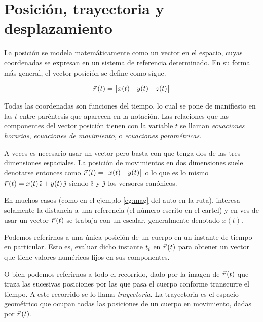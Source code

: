 \section{Posición, trayectoria y desplazamiento}

La posición se modela matemáticamente como un vector en el espacio, cuyas coordenadas se expresan en un sistema de referencia determinado.
En su forma más general, el vector posición se define como sigue.

\begin{mdframed}[style=DefinitionFrame]
    \begin{defn}
        \label{defn:position}
    \end{defn}
    \begin{equation*}
        \vec{r}\hspace{0.05cm}(t) = \begin{bmatrix} x(t) & y(t) & z(t) \end{bmatrix}
    \end{equation*}
\end{mdframed}

Todas las coordenadas son funciones del tiempo, lo cual se pone de manifiesto en las $t$ entre paréntesis que aparecen en la notación.
Las relaciones que las componentes del vector posición tienen con la variable $t$ se llaman \emph{ecuaciones horarias}, \emph{ecuaciones de movimiento}, o \emph{ecuaciones paramétricas}.

A veces es necesario usar un vector pero basta con que tenga dos de las tres dimensiones espaciales.
La posición de movimientos en dos dimensiones suele denotarse entonces como $\vec{r}\hspace{0.05cm}(t)={ \begin{bmatrix} x(t)&y(t) \end{bmatrix} }$ o lo que es lo mismo $\vec{r}\hspace{0.05cm}(t)=x(t)\,\hat{\imath} + y(t)\,\hat{\jmath}$ siendo $\hat{\imath}$ y $\hat{\jmath}$ los versores canónicos.

En muchos casos (como en el ejemplo \ref{eg:mag} del auto en la ruta), interesa solamente la distancia a una referencia (el número escrito en el cartel) y en ves de usar un vector $\vec{r}\hspace{0.05cm}(t)$ se trabaja con un escalar, generalmente denotado $x(t)$.

Podemos referirnos a una única posición de un cuerpo en un instante de tiempo en particular.
Esto es, evaluar dicho instante $t_i$ en $\vec{r}\hspace{0.05cm}(t)$ para obtener un vector que tiene valores numéricos fijos en sus componentes.

O bien podemos referirnos a todo el recorrido, dado por la imagen de $\vec{r}\hspace{0.05cm}(t)$ que traza las sucesivas posiciones por las que pasa el cuerpo conforme transcurre el tiempo.
A este recorrido se lo llama \emph{trayectoria}.
La trayectoria es el espacio geométrico que ocupan todas las posiciones de un cuerpo en movimiento, dadas por $\vec{r}\hspace{0.05cm}(t)$.


